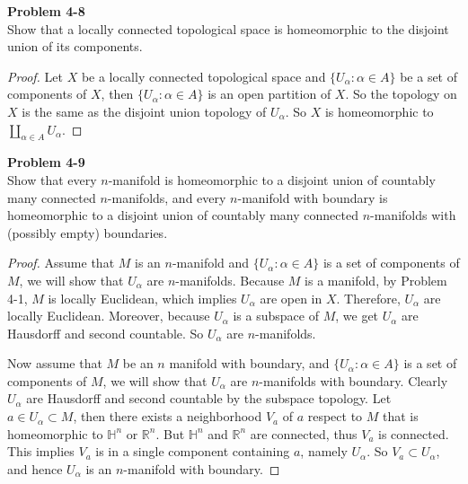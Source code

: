 \documentclass[12pt, a4paper]{article}
\theoremstyle{plain}
\newcommand{\Hs}{\mathbb{H}}
\newcommand{\R}{\mathbb{R}}
\newenvironment{problem}[2][Problem]
    { \begin{mdframed}[backgroundcolor=gray!20] \textbf{#1 #2} \\}
    {  \end{mdframed}}
\begin{document}
\begin{problem}{4-8}
Show that a locally connected topological space is homeomorphic to the disjoint union of its components.
\end{problem}
	\begin{proof}
	Let $X$ be a locally connected topological space and $\{U_\alpha:\alpha\in A\}$ be a set of components of $X$, then $\{U_\alpha:\alpha\in A\}$ is an open partition of $X$. So the topology on $X$ is the same as the disjoint union topology of $U_\alpha$. So $X$ is homeomorphic to $\coprod_{\alpha\in A}U_\alpha$.
	\end{proof}

\begin{problem}{4-9}
Show that every $n$-manifold is homeomorphic to a disjoint union of countably many connected $n$-manifolds, and every $n$-manifold with boundary is homeomorphic to a disjoint union of countably many connected $n$-manifolds with (possibly empty) boundaries.
\end{problem}
	\begin{proof}
	Assume that $M$ is an $n$-manifold and $\{U_\alpha:\alpha\in A\}$ is a set of components of $M$, we will show that $U_\alpha$ are $n$-manifolds. Because $M$ is a manifold, by Problem 4-1, $M$ is locally Euclidean, which implies $U_\alpha$ are open in $X$. Therefore, $U_\alpha$ are locally Euclidean. Moreover, because $U_\alpha$ is a subspace of $M$, we get $U_\alpha$ are Hausdorff and second countable. So $U_\alpha$ are $n$-manifolds.
	
	Now assume that $M$ be an $n$ manifold with boundary, and $\{U_\alpha:\alpha\in A\}$ is a set of components of $M$, we will show that $U_\alpha$ are $n$-manifolds with boundary. Clearly $U_\alpha$ are Hausdorff and second countable by the subspace topology. Let $a\in U_\alpha\subset M$, then there exists a neighborhood $V_a$ of $a$ respect to $M$ that is homeomorphic to $\Hs^n$ or $\R^n$. But $\Hs^n$ and $\R^n$ are connected, thus $V_a$ is connected. This implies $V_a$ is in a single component containing $a$, namely $U_\alpha$. So $V_a\subset U_\alpha$, and hence $U_\alpha$ is an $n$-manifold with boundary.
	\end{proof}
\end{document}
